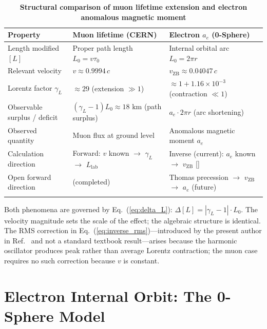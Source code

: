 \documentclass[%
 reprint, amsmath,amssymb, aps, prb, ]{revtex4-2}
\numberwithin{equation}{section}
\newcommand{\vZB}{v_{\text{ZB}}}
\newcommand{\gammaL}{\gamma_{L}}
\begin{document}
\begin{table}[t!]
\centering
\caption{\textbf{Structural comparison of muon lifetime extension and electron anomalous magnetic moment}}
\label{tab:comparison}
\renewcommand{\arraystretch}{1.4}
\begin{tabular}{p{4.8cm}p{5.2cm}p{6.2cm}}
\toprule
\textbf{Property}
& \textbf{Muon lifetime (CERN)}
& \textbf{Electron $a_e$ (0-Sphere)} \\
\midrule
Length modified $[L]$
& Proper path length $L_0 = v\tau_0$
& Internal orbital arc $L_0 = 2\pi r$ \\
\addlinespace[0.3cm]
Relevant velocity
& $v \approx 0.9994\,c$
& $\vZB \approx 0.04047\,c$ \\
\addlinespace[0.3cm]
Lorentz factor $\gammaL$
& $\approx 29$ (extension $\gg 1$)
& $\approx 1 + 1.16\times10^{-3}$ (contraction $\ll 1$) \\
\addlinespace[0.3cm]
Observable surplus / deficit
& $(\gammaL-1)L_0 \approx 18\text{ km}$ (path surplus)
& $a_e \cdot 2\pi r$ (arc shortening) \\
\addlinespace[0.3cm]
Observed quantity
& Muon flux at ground level~\cite{Bailey1977}
& Anomalous magnetic moment $a_e$~\cite{Hanneke2008} \\
\addlinespace[0.3cm]
Calculation direction
& Forward: $v$ known $\to$ $\gammaL$ $\to$ $L_{\text{lab}}$
& Inverse (current): $a_e$ known $\to$ $\vZB$ [\cite{Hanamura_2023_10}] \\
\addlinespace[0.3cm]
Open forward direction
& (completed)
& Thomas precession $\to$ $\vZB$ $\to$ $a_e$ (future) \\
\addlinespace[0.2cm]
\bottomrule
\end{tabular}
\vspace{0.2cm}
\begin{minipage}{0.95\textwidth}
\justifying\footnotesize
Both phenomena are governed by Eq.~(\ref{eq:delta_L}): $\Delta[L] = |\gammaL - 1|\cdot L_0$. The velocity magnitude sets the scale of the effect; the algebraic structure is identical. The RMS correction in Eq.~(\ref{eq:inverse_rms})---introduced by the present author in Ref.~\cite{Hanamura_2023_10} and not a standard textbook result---arises because the harmonic oscillator produces peak rather than average Lorentz contraction; the muon case requires no such correction because $v$ is constant.
\end{minipage}
\end{table}
\section{\label{sec:0sphere}Electron Internal Orbit: The 0-Sphere Model}
\end{document}
